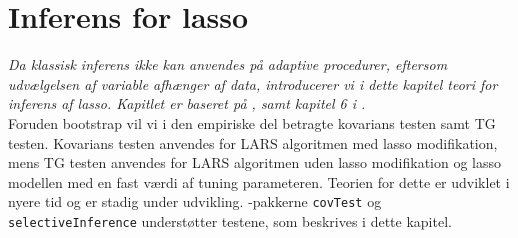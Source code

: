 \chapter{Inferens for lasso} \label{ch:statistisk_inferens}
\textit{Da klassisk inferens ikke kan anvendes på adaptive procedurer, eftersom udvælgelsen af variable afhænger af data, introducerer vi i dette kapitel teori for inferens af lasso. Kapitlet er baseret på \citep{lockhart}, \citep{post_inference} samt kapitel 6 i \citep{hastie}.} \\[4mm]
%
Foruden bootstrap vil vi i den empiriske del betragte kovarians testen samt TG testen.
Kovarians testen anvendes for LARS algoritmen med lasso modifikation, mens TG testen anvendes for LARS algoritmen uden lasso modifikation og lasso modellen med en fast værdi af tuning parameteren.
Teorien for dette er udviklet i nyere tid og er stadig under udvikling.
\Rlang-pakkerne \texttt{covTest} og \texttt{selectiveInference} understøtter testene, som beskrives i dette kapitel.







